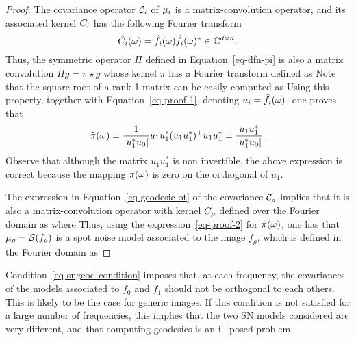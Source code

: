 \begin{proof}
	The covariance operator $\mathcal{C}_i$ of $\mu_i$ is a matrix-convolution operator, and its associated kernel $C_i$ has the following Fourier transform
	\begin{equation}
        \label{eq-proof-1}
		\hat \cov_i(\om) = \hat f_i(\om) \hat f_i(\om)^*  \in \CC^{d \times d}.
	\end{equation}	
	Thus, the symmetric operator $\Pi$ defined in Equation~\eqref{eq-dfn-pi} is also a matrix convolution $\Pi g = \pi \star g$ whose kernel $\pi$ has a Fourier transform defined as
	Note that the square root of a rank-1 matrix can be easily computed as
	Using this property, together with Equation~\eqref{eq-proof-1},
	denoting $u_i = \hat f_i(\omega)$, one proves that
	\begin{equation}
        \label{eq-proof-2}
		\hat \pi(\om)
        = \frac{1}{|u_1^*u_0|} u_1 u_1^* ( u_1 u_1^* )^{+} u_1 u_1^*
		= \frac{u_1 u_1^*}{|u_1^*u_0|}.
	\end{equation}
	Observe that although the matrix  $u_1 u_1^*$ 
	is non invertible, the above expression is correct because
	the mapping $\pi(\omega) $ is zero on the orthogonal of $u_1$.

	The expression in Equation~\eqref{eq-geodesic-ot} of the covariance $\mathcal{C}_\rho$ implies that it is also a matrix-convolution operator with kernel $C_\rho$ defined over the Fourier domain as
    where
	Thus, using the expression~\eqref{eq-proof-2} for $\hat \pi(\omega)$, one has that $\mu_\rho = \mathcal{S}(f_\rho)$ is a spot noise model associated to the image $f_\rho$, which is defined in the Fourier domain as
\end{proof}

Condition~\eqref{eq-sngeod-condition} imposes that, at each frequency, the covariances of the models associated to $f_0$ and $f_1$ should not be orthogonal to each others. This is likely to be the case for generic images. If this condition is not satisfied for a large number of frequencies, this implies that the two SN models considered are very different, and that computing geodesics is an ill-posed problem. 


